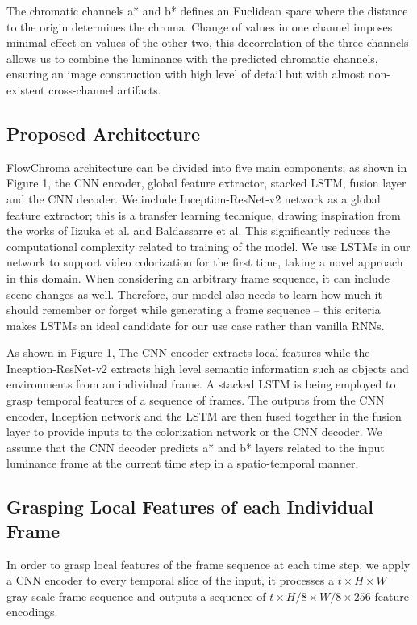 \documentclass[10pt,twocolumn,letterpaper]{article}
\begin{document}
The chromatic channels a* and b* defines an Euclidean space where the distance to the origin determines the chroma. Change of values in one channel imposes minimal effect on values of the other two, this decorrelation of the three channels allows us to combine the luminance with the predicted chromatic channels, ensuring an image construction with high level of detail but with almost non-existent cross-channel artifacts.

\subsection{Proposed Architecture}

FlowChroma architecture can be divided into five main components; as shown in Figure 1, the CNN encoder, global feature extractor, stacked LSTM, fusion layer and the CNN decoder. We include Inception-ResNet-v2 network as a global feature extractor; this is a transfer learning technique, drawing inspiration from the works of Iizuka et al. and Baldassarre et al. This significantly reduces the computational complexity related to training of the model. We use LSTMs in our network to support video colorization for the first time, taking a novel approach in this domain. When considering an arbitrary frame sequence, it can include scene changes as well. Therefore, our model also needs to learn how much it should remember or forget while generating a frame sequence -- this criteria makes LSTMs an ideal candidate for our use case rather than vanilla RNNs.

As shown in Figure 1, The CNN encoder extracts local features while the Inception-ResNet-v2 extracts high level semantic information such as objects and environments from an individual frame. A stacked LSTM is being employed to grasp temporal features of a sequence of frames. The outputs from the CNN encoder, Inception network and the LSTM are then fused together in the fusion layer to provide inputs to the colorization network or the CNN decoder. We assume that the CNN decoder predicts a* and b* layers related to the input luminance frame at the current time step in a spatio-temporal manner.

\subsection{Grasping Local Features of each Individual Frame}
In order to grasp local features of the frame sequence at each time step, we apply a CNN encoder to every temporal slice of the input, it processes a $t\times H\times W$ gray-scale frame sequence and outputs a sequence of $t\times H/8\times W/8\times 256$ feature encodings.
\end{document}
